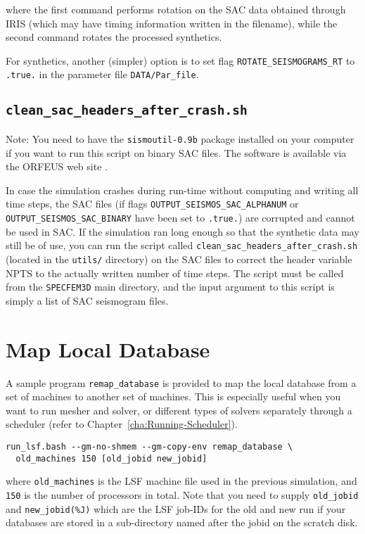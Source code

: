 \noindent
where the first command performs rotation on the SAC data obtained
through IRIS (which may have timing information written in the filename),
while the second command rotates the processed synthetics.

For synthetics, another (simpler) option is to set flag \texttt{ROTATE\_SEISMOGRAMS\_RT}
to \texttt{.true.} in the parameter file \texttt{DATA/Par\_file}.


\subsection{\texttt{clean\_sac\_headers\_after\_crash.sh}}

Note: You need to have the \texttt{sismoutil-0.9b} package installed
on your computer if you want to run this script on binary SAC files.
The software is available via the ORFEUS web site .

In case the simulation crashes during run-time without computing and
writing all time steps, the SAC files (if flags \texttt{OUTPUT\_SEISMOS\_SAC\_ALPHANUM}
or \texttt{OUTPUT\_SEISMOS\_SAC\_BINARY} have been set to \texttt{.true.})
are corrupted and cannot be used in SAC. If the simulation
ran long enough so that the synthetic data may still be of use, you
can run the script called \texttt{clean\_sac\_headers\_after\_crash.sh}
(located in the \texttt{utils/} directory) on the SAC files to correct
the header variable NPTS to the actually written number of time steps.
The script must be called from the \texttt{SPECFEM3D} main directory,
and the input argument to this script is simply a list of SAC seismogram
files.


\section{Map Local Database}

A sample program \texttt{remap\_database} is provided to map the local
database from a set of machines to another set of machines. This is
especially useful when you want to run mesher and solver, or different
types of solvers separately through a scheduler (refer to Chapter~\ref{cha:Running-Scheduler}).
\begin{verbatim}
run_lsf.bash --gm-no-shmem --gm-copy-env remap_database \
  old_machines 150 [old_jobid new_jobid]
\end{verbatim}
where \texttt{old\_machines} is the LSF machine file used in the previous
simulation, and \texttt{150} is the number of processors in total.
Note that you need to supply \texttt{old\_jobid} and \texttt{new\_jobid(\%J)}
which are the LSF job-IDs for the old and new run if your databases
are stored in a sub-directory named after the jobid on the scratch
disk.





